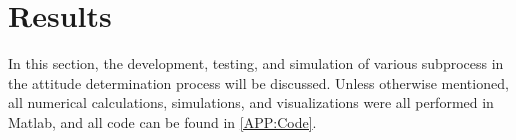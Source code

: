 \documentclass[]{aiaa-tc}%
\begin{document}
%
%
%
%
%
%

\section{Results}
In this section, the development, testing, and simulation of various subprocess in the attitude determination process will be discussed. Unless otherwise mentioned, all numerical calculations, simulations, and visualizations were all performed in Matlab, and all code can be found in \ref{APP:Code}.
\end{document}
